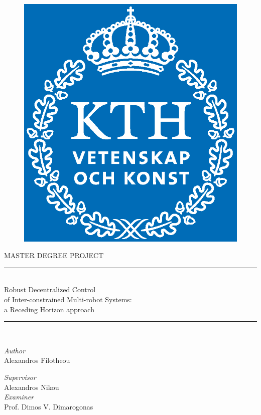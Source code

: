\begin{titlepage}

\begin{figure}\centering
  \includegraphics[scale=0.25]{./figures/KTH_Logotyp_CMYK_2013.eps} \\[0.8cm]
\end{figure}



 \begin{center}
    \Large MASTER DEGREE PROJECT\\[0.8cm]

  \rule{350pt}{4pt} \\[0.3cm]
    \LARGE{Robust Decentralized Control \\
      of Inter-constrained Multi-robot Systems: \\
      a Receding Horizon approach} \\[0.3cm]
  \rule{350pt}{4pt} \\[2cm]

  \begin{minipage}{0.4\textwidth}
  \begin{flushleft} \large
  \emph{Author} \\
    Alexandros Filotheou
  \end{flushleft}
  \end{minipage}
  \begin{minipage}{0.4\textwidth}
  \begin{flushright} \large
  \emph{Supervisor} \\
    Alexandros Nikou \\
    \emph{Examiner} \\
    Prof. Dimos V. Dimarogonas
  \end{flushright}
  \end{minipage}
  \vfill


\end{center}
\end{titlepage}
